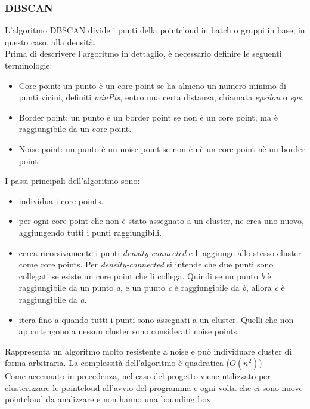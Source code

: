 \documentclass[italian]{article}
\begin{document}
\subsubsection{DBSCAN}
L'algoritmo DBSCAN divide i punti della pointcloud in batch o gruppi in base, in questo caso, alla densità.\\
Prima di descrivere l'argoritmo in dettaglio, è necessario definire le seguenti terminologie:
\begin{itemize}
	\item Core point: un punto è un core point se ha almeno un numero minimo di punti vicini, definiti \textit{minPts}, entro una certa distanza, chiamata \textit{epsilon} o \textit{eps}.
	\item Border point: un punto è un border point se non è un core point, ma è raggiungibile da un core point.
	\item Noise point: un punto è un noise point se non è nè un core point nè un border point.
\end{itemize}
I passi principali dell'algoritmo sono:
\begin{itemize}
	\item individua i core points.
	\item per ogni core point che non è stato assegnato a un cluster, ne crea uno nuovo, aggiungendo tutti i punti raggiungibili.
	\item cerca ricorsivamente i punti \textit{density-connected} e li aggiunge allo stesso cluster come core points. Per \textit{density-connected} si intende che due punti sono collegati se esiste un core point che li collega.		Quindi se un punto \textit{b} è raggiungibile da un punto \textit{a}, e un punto \textit{c} è raggiungibile da \textit{b}, allora \textit{c} è raggiungibile da \textit{a}.
	\item itera fino a quando tutti i punti sono assegnati a un cluster. Quelli che non appartengono a nessun cluster sono considerati noise points.
\end{itemize}
Rappresenta un algoritmo molto resistente a noise e può individuare cluster di forma arbitraria. La complessità dell'algoritmo è quadratica ($O(n^2)$)\\
Come accennato in precedenza, nel caso del progetto viene utilizzato per clusterizzare le pointcloud all'avvio del programma e ogni volta che ci sono nuove pointcloud da analizzare e non hanno una bounding box.
\end{document}
